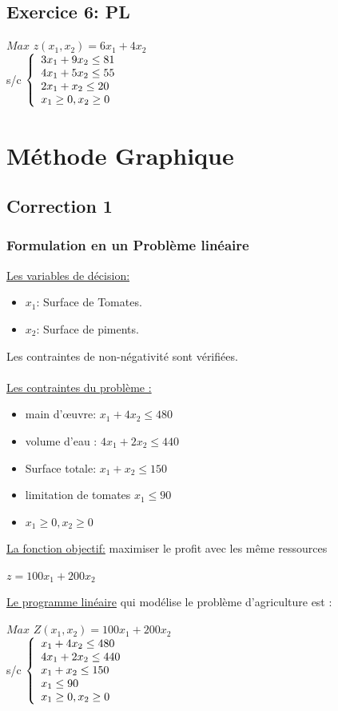 \documentclass[]{book}
\begin{document}
\subsection*{Exercice 6: PL}
    $Max$ $z(x_1,x_2) = 6x_1 + 4x_2$\\
s/c $\left\{
	\begin{array}l
	3x_1 + 9x_2 \leq 81\\
    4x_1 + 5x_2 \leq 55\\
    2x_1 + x_2 \leq 20\\
	x_1 \geq 0, x_2 \geq 0\end{array}
	\right.$
 \section{Méthode Graphique}
   
\subsection*{Correction 1}
\subsubsection{Formulation en un Problème linéaire}
\underline{Les variables de décision:}
\begin{itemize}
    \item $x_1$: Surface de Tomates.
    \item $x_2$: Surface de piments.
\end{itemize}
Les contraintes de non-négativité sont vérifiées.\\\\
\underline{Les contraintes du problème :}
\begin{itemize}
    \item main d’œuvre: $ x_1 + 4x_2 \leq 480$
    \item volume d'eau : $ 4x_1 + 2 x_2\leq 440$
    \item Surface totale: $x_1 + x_2 \leq 150 $
    \item limitation de tomates $x_1 \leq 90$
    \item $x_1 \geq 0, x_2 \geq 0$
\end{itemize}
\underline{La fonction objectif:}
maximiser le profit avec les même ressources 

\begin{center}
    $z = 100 x_1 + 200 x_2$
\end{center}
\underline{Le programme linéaire} qui modélise le problème d’agriculture est :
\begin{center}
    $Max$ $Z(x_1,x_2) = 100 x_1 + 200 x_2$\\
s/c $\left\{
	\begin{array}l
	x_1 + 4x_2 \leq 480\\
    4x_1 + 2 x_2\leq 440\\
    x_1 + x_2 \leq 150\\
	x_1 \leq 90\\
    x_1 \geq 0, x_2 \geq 0\end{array}
	\right.$
\end{center} 
\end{document}

